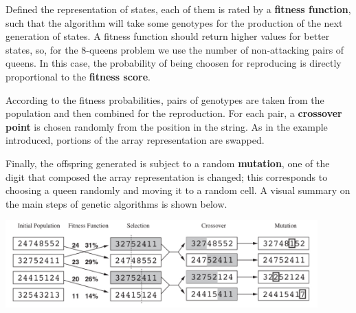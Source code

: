 Defined the representation of states, each of them is rated by a \textbf{fitness function}, such that the algorithm will take some genotypes for the production of the next 
generation of states. A fitness function should return higher values for better states, so, for the 8-queens problem we use the number of non-attacking pairs of queens. In 
this case, the probability of being choosen for reproducing is directly proportional to the \textbf{fitness score}. \vspace{3.5pt}

According to the fitness probabilities, pairs of genotypes are taken from the population and then combined for the reproduction. For each pair, a \textbf{crossover point} is 
chosen randomly from the position in the string. As in the example introduced, portions of the array representation are swapped. \vspace{3.5pt}

Finally, the offspring generated is subject to a random \textbf{mutation}, one of the digit that composed the array representation is changed; this corresponds to choosing a 
queen randomly and moving it to a random cell. A visual summary on the main steps of genetic algorithms is shown below. \vspace{3.5pt}
\begin{center}
    \includegraphics[width=0.9\textwidth]{img/img7.png}
\end{center} \vspace{3.5pt}